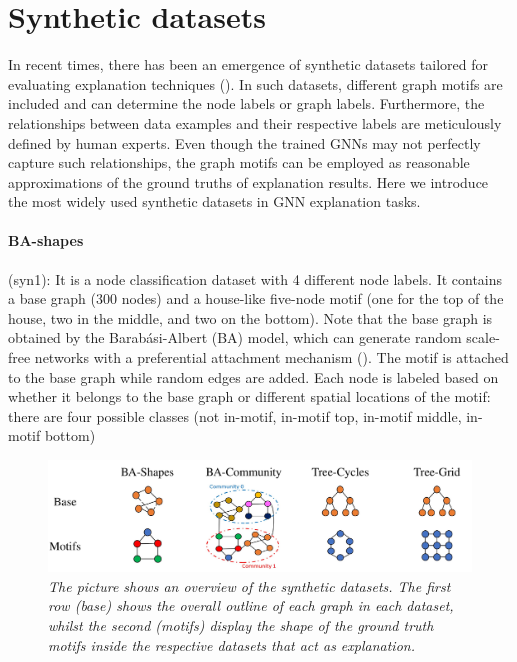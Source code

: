 \documentclass[binding=0.6cm]{sapthesis}
\newcommand{\mycite}[1]{(\cite{#1})}
\begin{document}
\section{Synthetic datasets}
\label{sec:expRes.syns-dataset}
In recent times, there has been an emergence of synthetic datasets tailored for evaluating explanation techniques (\cite{ying2019-gnnexplainer,luo2020-pgexplainer}). In such datasets, different graph motifs are included and can determine the node labels or graph labels. Furthermore, the relationships between data examples and their respective labels are meticulously defined by human experts. Even though the trained GNNs may not perfectly capture such relationships, the graph motifs can be employed as reasonable approximations of the ground truths of explanation results. Here we introduce the most widely used synthetic datasets in GNN explanation tasks.

\paragraph{BA-shapes}
\label{sec:expRes.ba-shapes}
(syn1): It is a node classification dataset with 4 different node labels. It contains a base graph (300 nodes) and a house-like five-node motif (one for the top of the house, two in the middle, and two on the bottom). 
Note that the base graph is obtained by the Barabási-Albert (BA) model, which can generate random scale-free networks with a preferential attachment mechanism \mycite{albert2002-barabasi}. 
The motif is attached to the base graph while random edges are added. Each node is labeled based on whether it belongs to the base graph or different spatial locations of the motif: there are four possible classes (not in-motif, in-motif top, in-motif middle, in-motif bottom) 
\begin{figure}
    \centering
    \includegraphics[width=\textwidth]{imgs/cfpg/syn-datasets.png}
    \caption{\textit{The picture shows an overview of the synthetic datasets. The first row (base) shows the overall outline of each graph in each dataset, whilst the second (motifs) display the shape of the ground truth motifs inside the respective datasets that act as explanation.}}
    \label{fig:enter-label}
\end{figure}
\end{document}
